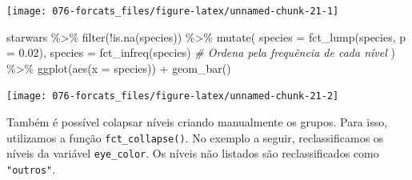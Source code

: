 \documentclass[
]{book}
\newenvironment{Shaded}{\begin{snugshade}}{\end{snugshade}}
\newcommand{\AttributeTok}[1]{\textcolor[rgb]{0.77,0.63,0.00}{#1}}
\newcommand{\CommentTok}[1]{\textcolor[rgb]{0.56,0.35,0.01}{\textit{#1}}}
\newcommand{\FloatTok}[1]{\textcolor[rgb]{0.00,0.00,0.81}{#1}}
\newcommand{\FunctionTok}[1]{\textcolor[rgb]{0.00,0.00,0.00}{#1}}
\newcommand{\NormalTok}[1]{#1}
\newcommand{\SpecialCharTok}[1]{\textcolor[rgb]{0.00,0.00,0.00}{#1}}
\begin{document}
\begin{center}\texttt{[image: 076-forcats\_files/figure-latex/unnamed-chunk-21-1]} \end{center}

\begin{Shaded}
\begin{Highlighting}[]


\NormalTok{starwars }\SpecialCharTok{\%\textgreater{}\%} 
  \FunctionTok{filter}\NormalTok{(}\SpecialCharTok{!}\FunctionTok{is.na}\NormalTok{(species)) }\SpecialCharTok{\%\textgreater{}\%} 
  \FunctionTok{mutate}\NormalTok{(}
    \AttributeTok{species =} \FunctionTok{fct\_lump}\NormalTok{(species, }\AttributeTok{p =} \FloatTok{0.02}\NormalTok{),}
    \AttributeTok{species =} \FunctionTok{fct\_infreq}\NormalTok{(species) }\CommentTok{\# Ordena pela frequência de cada nível}
\NormalTok{  ) }\SpecialCharTok{\%\textgreater{}\%} 
  \FunctionTok{ggplot}\NormalTok{(}\FunctionTok{aes}\NormalTok{(}\AttributeTok{x =}\NormalTok{ species)) }\SpecialCharTok{+}
  \FunctionTok{geom\_bar}\NormalTok{()}
\end{Highlighting}
\end{Shaded}

\begin{center}\texttt{[image: 076-forcats\_files/figure-latex/unnamed-chunk-21-2]} \end{center}

Também é possível colapsar níveis criando manualmente os grupos. Para isso, utilizamos a função \texttt{fct\_collapse()}. No exemplo a seguir, reclassificamos os níveis da variável \texttt{eye\_color}. Os níveis não listados são reclassificados como \texttt{"outros"}.
\end{document}

